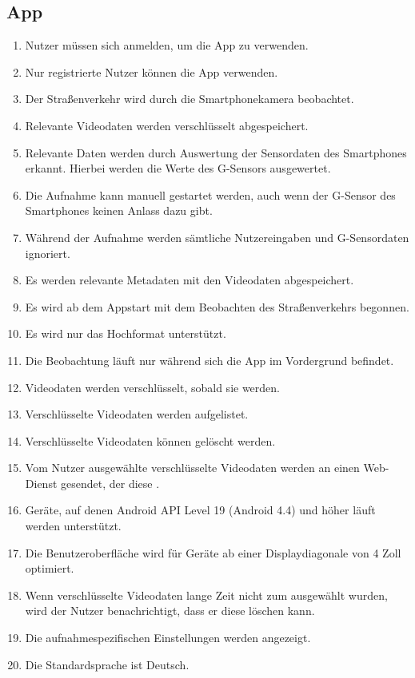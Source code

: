 \subsection{App}
	\begin{enumerate}
	\renewcommand{\labelenumi}{\textbf{\theenumi}}
	\renewcommand{\theenumi}{PK\arabic{enumi}0}
	\setcounter{enumi}{99}
	\item Nutzer müssen sich anmelden, um die \gls{App} zu verwenden.
	\item Nur registrierte Nutzer können die \gls{App} verwenden.
	\item Der Straßenverkehr wird durch die \gls{Smartphone}kamera beobachtet.
	\item Relevante Videodaten werden verschlüsselt abgespeichert.
	\item Relevante Daten werden durch Auswertung der Sensordaten des \glspl{Smartphone} erkannt. Hierbei werden die Werte des G-Sensors ausgewertet.
	\item Die Aufnahme kann manuell gestartet werden, auch wenn der \gls{G-Sensor} des Smartphones keinen Anlass dazu gibt.
	\item Während der Aufnahme werden sämtliche Nutzereingaben und \gls{G-Sensor}daten ignoriert.
	\item Es werden relevante \gls{Metadaten} mit den Videodaten abgespeichert.
	\item Es wird ab dem \gls{App}start mit dem Beobachten des Straßenverkehrs begonnen.
	\item Es wird nur das Hochformat unterstützt.
	\item Die Beobachtung läuft nur während sich die \gls{App} im Vordergrund befindet.
	\item Videodaten werden verschlüsselt, sobald sie  werden.
	\item Verschlüsselte Videodaten werden aufgelistet.
	\item Verschlüsselte Videodaten können gelöscht werden.
	\item Vom Nutzer ausgewählte verschlüsselte Videodaten werden an einen \gls{Web-Dienst} gesendet, der diese .
	\item Geräte, auf denen \gls{Android} \gls{API} Level 19 (Android 4.4) und höher läuft werden unterstützt.
	\item Die Benutzeroberfläche wird für Geräte ab einer Displaydiagonale von 4 Zoll optimiert.
	\item Wenn verschlüsselte Videodaten lange Zeit nicht zum  ausgewählt wurden, wird der Nutzer benachrichtigt, dass er diese löschen kann.
	\item Die aufnahmespezifischen Einstellungen werden angezeigt.
	\item Die Standardsprache ist Deutsch.
	\end{enumerate}

